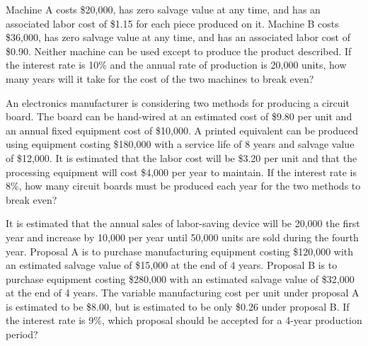 \begin{exercises}
    \begin{exercise}
    \label{sea-08-22}
        Machine A costs \$20,000, has zero salvage value at any time, and has an associated labor cost of \$1.15 for each piece produced on it. Machine B costs \$36,000, has zero salvage value at any time, and has an associated labor cost of \$0.90. Neither machine can be used except to produce the product described. If the interest rate is 10\% and the annual rate of production is 20,000 units, how many years will it take for the cost of the two machines to break even?
    \end{exercise}
    \begin{solution}
    \end{solution}
    
    \begin{exercise}
    \label{sea-08-23}
        An electronics manufacturer is considering two methods for producing a circuit board. The board can be hand-wired at an estimated cost of \$9.80 per unit and an annual fixed equipment cost of \$10,000. A printed equivalent can be produced using equipment costing \$180,000 with a service life of 8 years and salvage value of \$12,000. It is estimated that the labor cost will be \$3.20 per unit and that the processing equipment will cost \$4,000 per year to maintain. If the interest rate is 8\%, how many circuit boards must be produced each year for the two methods to break even?
    \end{exercise}
    \begin{solution}
    \end{solution}
    
    \begin{exercise}
    \label{sea-08-24}
        It is estimated that the annual sales of labor-saving device will be 20,000 the first year and increase by 10,000 per year until 50,000 units are sold during the fourth year. Proposal A is to purchase manufacturing equipment costing \$120,000 with an estimated salvage value of \$15,000 at the end of 4 years. Proposal B is to purchase equipment costing \$280,000 with an estimated salvage value of \$32,000 at the end of 4 years. The variable manufacturing cost per unit under proposal A is estimated to be \$8.00, but is estimated to be only \$0.26 under proposal B. If the interest rate is 9\%, which proposal should be accepted for a 4-year production period?
    \end{exercise}
    \begin{solution}
    \end{solution}
    

\end{exercises}

